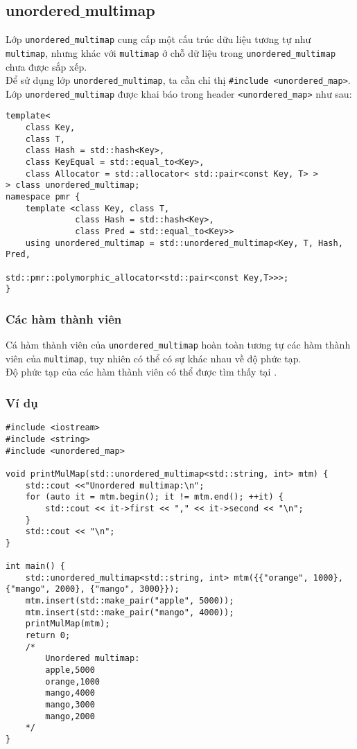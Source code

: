 \subsection{unordered$\_$multimap}
Lớp \lstinline{unordered_multimap} cung cấp một cấu trúc dữu liệu tương tự như \lstinline{multimap}, nhưng khác với \lstinline{multimap} ở chỗ dữ liệu trong \lstinline{unordered_multimap} chưa được sắp xếp.\\
Để sử dụng lớp \lstinline{unordered_multimap}, ta cần chỉ thị \lstinline{#include <unordered_map>}.\\
Lớp \lstinline{unordered_multimap} được khai báo trong header \lstinline{<unordered_map>} như sau: \cite{unmultimap}
\begin{lstlisting}
template<
    class Key,
    class T,
    class Hash = std::hash<Key>,
    class KeyEqual = std::equal_to<Key>,
    class Allocator = std::allocator< std::pair<const Key, T> >
> class unordered_multimap;
namespace pmr {
    template <class Key, class T,
              class Hash = std::hash<Key>,
              class Pred = std::equal_to<Key>>
    using unordered_multimap = std::unordered_multimap<Key, T, Hash, Pred,
                                   std::pmr::polymorphic_allocator<std::pair<const Key,T>>>;
}
\end{lstlisting}
\subsubsection{Các hàm thành viên}
Cá hàm thành viên của \lstinline{unordered_multimap} hoàn toàn tương tự các hàm thành viên của \lstinline{multimap}, tuy nhiên có thể có sự khác nhau về độ phức tạp.\\
Độ phức tạp của các hàm thành viên có thể được tìm thấy tại \cite{unmultimap}.
\subsubsection{Ví dụ}
\begin{lstlisting}
#include <iostream>
#include <string>
#include <unordered_map>

void printMulMap(std::unordered_multimap<std::string, int> mtm) {
    std::cout <<"Unordered multimap:\n";
    for (auto it = mtm.begin(); it != mtm.end(); ++it) {
        std::cout << it->first << "," << it->second << "\n";
    }
    std::cout << "\n";
}

int main() {
    std::unordered_multimap<std::string, int> mtm({{"orange", 1000}, {"mango", 2000}, {"mango", 3000}});
    mtm.insert(std::make_pair("apple", 5000));
    mtm.insert(std::make_pair("mango", 4000));
    printMulMap(mtm);
    return 0;
    /*
        Unordered multimap:
        apple,5000
        orange,1000
        mango,4000
        mango,3000
        mango,2000
    */
}
\end{lstlisting}